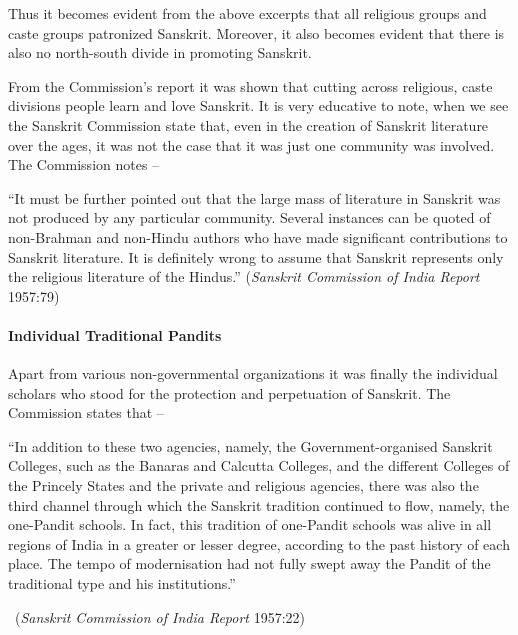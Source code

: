 Thus it becomes evident from the above excerpts that all religious groups and caste groups patronized Sanskrit. Moreover, it also becomes evident that there is also no north-south divide in promoting Sanskrit. 

From the Commission’s report it was shown that cutting across religious, caste divisions people learn and love Sanskrit. It is very educative to note, when we see the Sanskrit Commission state that, even in the creation of Sanskrit literature over the ages, it was not the case that it was just one community was involved. The Commission notes –
\begin{myquote}
\eleven
“It must be further pointed out that the large mass of literature in Sanskrit was not produced by any particular community. Several instances can be quoted of non-Brahman and non-Hindu authors who have made significant contributions to Sanskrit literature. It is definitely wrong to assume that Sanskrit represents only the religious literature of the Hindus.”  \hfill ({\sl Sanskrit Commission of India Report} 1957:79)
\end{myquote}

\paragraph{Individual Traditional Pandits}

Apart from various non-governmental organizations it was finally the individual scholars who stood for the protection and perpetuation of Sanskrit. The Commission states that –
\begin{myquote}
\eleven
“In addition to these two agencies, namely, the Government-organised Sanskrit Colleges, such as the Banaras and Calcutta Colleges, and the different Colleges of the Princely States and the private and religious agencies, there was also the third channel through which the Sanskrit tradition continued to flow, namely, the one-Pandit schools. In fact, this tradition of one-Pandit schools was alive in all regions of India in a greater or lesser degree, according to the past history of each place. The tempo of modernisation had not fully swept away the Pandit of the traditional type and his institutions.” 
\vskip -5pt

~\hfill({\sl Sanskrit Commission of India Report }1957:22)
\end{myquote}

